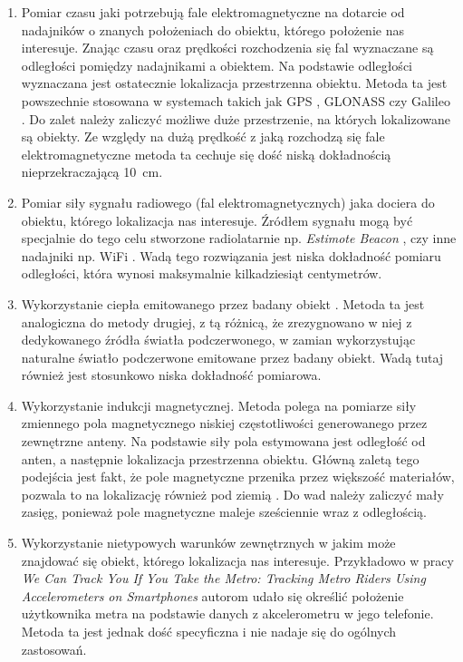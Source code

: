 \begin{enumerate}
 \item
 Pomiar czasu jaki potrzebują fale elektromagnetyczne na dotarcie od nadajników o znanych położeniach 
 do obiektu, którego położenie nas interesuje.
 Znając czasu oraz prędkości rozchodzenia się fal wyznaczane są odległości pomiędzy nadajnikami a obiektem.
 Na podstawie odległości wyznaczana jest ostatecznie lokalizacja przestrzenna obiektu. 
 Metoda ta jest powszechnie stosowana w systemach takich jak GPS \cite{bib:gps}, GLONASS \cite{bib:GLONASS} czy Galileo \cite{bib:galileo}.
 Do zalet należy zaliczyć możliwe duże przestrzenie, na których lokalizowane są obiekty.
 Ze względy na dużą prędkość z jaką rozchodzą się fale elektromagnetyczne metoda ta cechuje się dość niską 
 dokładnością nieprzekraczającą \SI{10}{cm}.
 
 \item
 Pomiar siły sygnału radiowego (fal elektromagnetycznych) jaka dociera do obiektu, którego lokalizacja nas interesuje.
 Źródłem sygnału mogą być specjalnie do tego celu stworzone radiolatarnie np. \textit{Estimote Beacon} \cite{bib:beacon},
 czy inne nadajniki np. WiFi \cite{bib:lokWiFi}.
 Wadą tego rozwiązania jest niska dokładność pomiaru odległości, która wynosi maksymalnie kilkadziesiąt centymetrów.  
 
 \item
 Wykorzystanie ciepła emitowanego przez badany obiekt \cite{bib:PIRsens}.
 Metoda ta jest analogiczna do metody drugiej, z tą różnicą, że zrezygnowano w niej
 z dedykowanego źródła światła podczerwonego, w zamian wykorzystując naturalne światło podczerwone emitowane 
 przez badany obiekt. Wadą tutaj również jest stosunkowo niska dokładność pomiarowa.
 
 \item
 Wykorzystanie indukcji magnetycznej. Metoda polega na pomiarze siły zmiennego pola magnetycznego niskiej częstotliwości
 generowanego przez zewnętrzne anteny. Na podstawie siły pola estymowana jest odległość 
 od anten, a następnie lokalizacja przestrzenna obiektu.
 Główną zaletą tego podejścia jest fakt, że pole magnetyczne przenika przez większość materiałów, pozwala to na 
 lokalizację również pod ziemią \cite{bib:chomiki}. Do wad należy zaliczyć mały zasięg, ponieważ pole magnetyczne maleje 
 sześciennie wraz z odległością.   
 
 \item 
 Wykorzystanie nietypowych warunków zewnętrznych w jakim może znajdować się obiekt, którego lokalizacja nas interesuje.
 Przykładowo w pracy \textit{We Can Track You If You Take the Metro: Tracking Metro
Riders Using Accelerometers on Smartphones} \cite{bib:metro} autorom udało się określić położenie
użytkownika metra na podstawie danych z akcelerometru w jego telefonie.
Metoda ta jest jednak dość specyficzna i nie nadaje się do ogólnych zastosowań. 
 
\end{enumerate}
 

